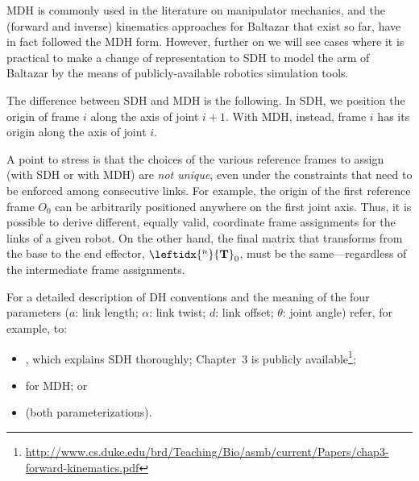 \ac{MDH} is commonly used in the literature on manipulator mechanics, and the (forward and inverse) kinematics approaches for Baltazar that exist so far, have in fact followed the \ac{MDH} form. However, further on we will see cases where it is practical to make a change of representation to \ac{SDH} to model the arm of Baltazar by the means of publicly-available robotics simulation tools.

The difference between \ac{SDH} and \ac{MDH} is the following. In \ac{SDH}, we position the origin of frame $i$ along the axis of joint $i+1$. With \ac{MDH}, instead, frame $i$ has its origin along the axis of joint $i$.

A point to stress is that the choices of the various reference frames to assign (with \acs{SDH} or with \acs{MDH}) are \emph{not unique}, even under the constraints that need to be enforced among consecutive links. For example, the origin of the first reference frame $O_0$ can be arbitrarily positioned anywhere on the first joint axis. Thus, it is possible to derive different, equally valid, coordinate frame assignments for the links of a given robot. On the other hand, the final matrix that transforms from the base to the end effector, $\leftidx{^n}{\mathbf{T}}_0$, must be the same---regardless of the intermediate frame assignments.

For a detailed description of \ac{DH} conventions and the meaning of the four parameters ($a$: link length; $\alpha$: link twist; $d$: link offset; $\theta$: joint angle) refer, for example, to:
\begin{itemize}
\item \cite{spong}, which explains \ac{SDH} thoroughly; Chapter~3 is publicly available\footnote{\url{http://www.cs.duke.edu/brd/Teaching/Bio/asmb/current/Papers/chap3-forward-kinematics.pdf}};

\item \cite{craig} for \ac{MDH}; or

\item \cite{corke:1996} (both parameterizations).
\end{itemize}




